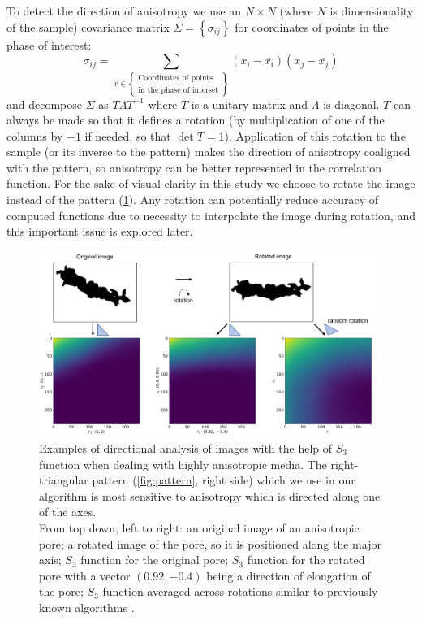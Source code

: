 \documentclass[reprint,amsmath,amssymb,aps,pre,showkeys,showpacs]{revtex4-1}
\begin{document}
To detect the direction of anisotropy we use an $N \times N$ (where $N$ is
dimensionality of the sample) covariance matrix
$\Sigma = \left\{ \sigma_{ij} \right\}$ for coordinates of points in the phase of
interest:
\begin{equation}
  \sigma_{ij} = \sum_{x \in \left\{
    \begin{array}{l}
      \text{Coordinates of points} \\
      \text{in the phase of interset}
    \end{array}
    \right\}} (x_i - \overline{x_i})(x_j - \overline{x_j})
\end{equation}
and decompose $\Sigma$ as $T \Lambda T^{-1}$ where $T$ is a unitary matrix and
$\Lambda$ is diagonal. $T$ can always be made so that it defines a rotation (by
multiplication of one of the columns by $-1$ if needed, so that
$\det T = 1$). Application of this rotation to the sample (or its inverse to the
pattern) makes the direction of anisotropy coaligned with the pattern, so
anisotropy can be better represented in the correlation function. For the sake
of visual clarity in this study we choose to rotate the image instead of the
pattern (\cref{fig:aniso}). Any rotation can potentially reduce accuracy of
computed functions due to necessity to interpolate the image during
rotation, and this important issue is explored later.
\begin{figure}[ht]
  \centering
  \includegraphics[width=0.8\linewidth]{images/fig_rot.png}
  \caption{Examples of directional analysis of images with the help of $S_3$
    function when dealing with highly anisotropic media. The right-triangular
    pattern (\cref{fig:pattern}, right side) which we use in our algorithm is
    most sensitive to anisotropy which is directed along one of the
    axes. \\ From top down, left to right: an original image of an anisotropic
    pore; a rotated image of the pore, so it is positioned along the major axis;
    $S_3$ function for the original pore; $S_3$ function for the rotated pore
    with a vector $(0.92, -0.4)$ being a direction of elongation of the pore;
    $S_3$ function averaged across rotations similar to previously known
    algorithms \cite{berryman1988,SMITH1988176,malmir2018}.}
  \label{fig:aniso}
\end{figure}
\end{document}
